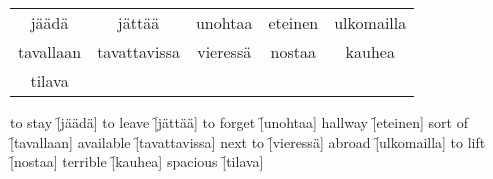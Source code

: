 \begin{center}
  \begin{tabular}{|c c c c c|}
    \hline
    jäädä & jättää & unohtaa & eteinen & ulkomailla \\
    tavallaan & tavattavissa & vieressä & nostaa & kauhea \\
    tilava &&&& \\
    \hline
  \end{tabular}
\end{center}

\begin{questions}
  \begin{multicols}{3}
    \raggedcolumns
    \question to stay   \f[jäädä]
    \question to leave  \f[jättää]
    \question to forget \f[unohtaa]
    \question hallway   \f[eteinen]
    \question sort of   \f[tavallaan]
    \question available \f[tavattavissa]
    \question next to   \f[vieressä]
    \question abroad    \f[ulkomailla]
    \question to lift   \f[nostaa]
    \question terrible  \f[kauhea]
    \question spacious  \f[tilava]
  \end{multicols}
\end{questions}
